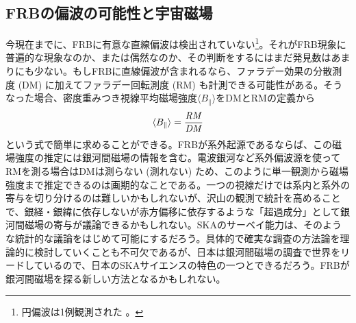 \subsection{FRBの偏波の可能性と宇宙磁場} \label{transients.s3.frb.magnetism}

今現在までに、FRBに有意な直線偏波は検出されていない\footnote{円偏波は1例観測された \citep{2015MNRAS.447..246P}。}。それがFRB現象に普遍的な現象なのか、または偶然なのか、その判断をするにはまだ発見数はあまりにも少ない。もしFRBに直線偏波が含まれるなら、ファラデー効果の分散測度 (DM) に加えてファラデー回転測度 (RM) も計測できる可能性がある。そうなった場合、密度重みつき視線平均磁場強度$\langle B_\parallel \rangle $をDMとRMの定義から
\begin{equation}
\langle B_\parallel \rangle =\frac{{\it RM}}{{\it DM}}
\end{equation}
という式で簡単に求めることができる。FRBが系外起源であるならば、この磁場強度の推定には銀河間磁場の情報を含む。電波銀河など系外偏波源を使ってRMを測る場合はDMは測らない (測れない) ため、このように単一観測から磁場強度まで推定できるのは画期的なことである。一つの視線だけでは系内と系外の寄与を切り分けるのは難しいかもしれないが、沢山の観測で統計を高めることで、銀経・銀緯に依存しないが赤方偏移に依存するような「超過成分」として銀河間磁場の寄与が議論できるかもしれない。SKAのサーベイ能力は、そのような統計的な議論をはじめて可能にするだろう。具体的で確実な調査の方法論を理論的に検討していくことも不可欠であるが、日本は銀河間磁場の調査で世界をリードしているので\citep{2014PASJ...66...65A,2014ApJ...790..123A}、日本のSKAサイエンスの特色の一つとできるだろう。FRBが銀河間磁場を探る新しい方法となるかもしれない。